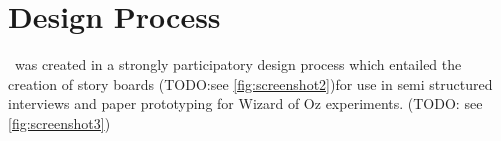 \documentclass{chi-ext}
\begin{document}

\section{Design Process}
\drunkened\ was created in a strongly participatory design process which entailed the creation of story boards (TODO:see \autoref{fig:screenshot2})for use in semi structured interviews and paper prototyping for Wizard of Oz experiments. (TODO: see \autoref{fig:screenshot3})
\end{document}
